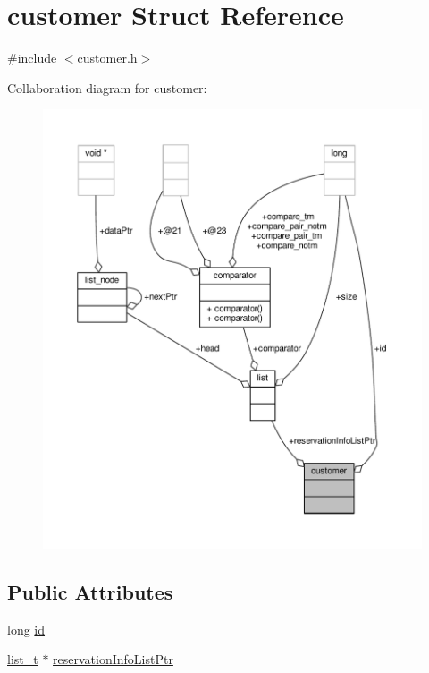 \hypertarget{structcustomer}{\section{customer Struct Reference}
\label{structcustomer}
}


{\ttfamily \#include $<$customer.\-h$>$}



Collaboration diagram for customer\-:
\nopagebreak
\begin{figure}[H]
\begin{center}
\leavevmode
\includegraphics[width=350pt]{structcustomer__coll__graph}
\end{center}
\end{figure}
\subsection*{Public Attributes}
\begin{DoxyCompactItemize}
\item 
long \hyperlink{structcustomer_a8e46257d66f8dba2d242342525dc35bf}{id}
\item 
\hyperlink{list_8h_af629e6a6713d7de11eab50cbe6449b06}{list\-\_\-t} $\ast$ \hyperlink{structcustomer_a4e371b258aaa4b5621369db7619b5a1c}{reservation\-Info\-List\-Ptr}
\end{DoxyCompactItemize}


